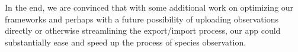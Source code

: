 In the end, we are convinced that with some additional work on optimizing our frameworks and perhaps with a future possibility of uploading observations directly or otherwise streamlining the export/import process, our app could substantially ease and speed up the process of species observation.

